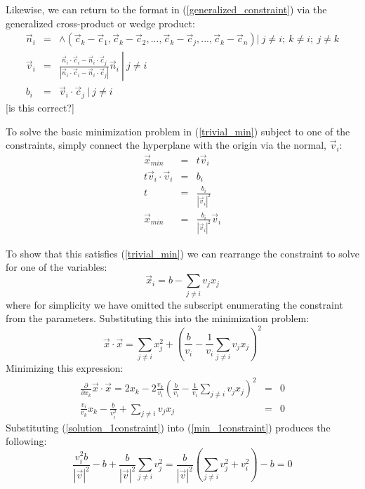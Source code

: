 \documentclass{article}
\begin{document}
Likewise, we can return to the format in (\ref{generalized_constraint}) via the
generalized cross-product or wedge product:
\begin{eqnarray}
	\vec n_i & = & \wedge \left (\vec c_k - \vec c_1,\vec c_k - \vec c_2,
	...,\vec c_k-\vec c_j,...,\vec c_k-\vec c_n \right ) 
	|~ j \ne i;~k \ne i;~j \ne k \\
	\vec v_i & = & 
	\left . 
	\frac{\vec n_i \cdot \vec c_i - \vec n_i \cdot \vec c_j}
	{\left | \vec n_i \cdot \vec c_i - \vec n_i \cdot \vec c_j \right |}
	\vec n_i
	~\right | ~j \ne i \\
	b_i & = & \vec v_i \cdot \vec c_j ~|~j \ne i
\end{eqnarray}
[is this correct?]

To solve the basic minimization problem in (\ref{trivial_min}) subject to
one of the constraints, simply connect the hyperplane with the origin via
the normal, $\vec v_i$:
\begin{eqnarray}
	\vec x_{min} & = & t \vec v_i \\
	t \vec v_i \cdot \vec v_i & = & b_i \\
	t & = & \frac{b_i}{|\vec v_i|^2} \\
	\vec x_{min} & = & \frac{b_i}{|\vec v_i |^2} \vec v_i \label{solution_1constraint}
\end{eqnarray}

To show that this satisfies (\ref{trivial_min}) we can rearrange the constraint
to solve for one of the variables:
\begin{equation}
	\vec x_i = b - \sum_{j \ne i} v_j x_j
\end{equation}
where for simplicity we have omitted the subscript enumerating the constraint
from the parameters.
Substituting this into the minimization problem:
\begin{equation}
	\vec x \cdot \vec x = \sum_{j \ne i} x_j^2 + 
	\left (\frac{b}{v_i} - \frac{1}{v_i} \sum_{j \ne i} v_j x_j \right )^2
\end{equation}
Minimizing this expression:
\begin{eqnarray}
	\frac{\partial}{\partial x_k} \vec x \cdot \vec x = 2 x_k - 2 \frac{v_k}{v_i} \left (\frac{b}{v_i} - \frac{1}{v_i} \sum_{j \ne i} v_j x_j \right )^2 
	& = & 0 \\
	\frac{v_i}{v_k} x_k - \frac{b}{v_i^2} + \sum_{j \ne i} v_j x_j & = & 0
	\label{min_1constraint}
\end{eqnarray}
Substituting (\ref{solution_1constraint}) into (\ref{min_1constraint})
produces the following:
\begin{equation}
	\frac{v_i^2 b}{|\vec v|^2} - b + \frac{b}{|\vec v|^2} \sum_{j \ne i} v_j^2 
    = \frac{b}{|\vec v|^2} \left (\sum_{j \ne i} v_j^2 + v_i^2 \right ) - b = 0
\end{equation}
\end{document}
